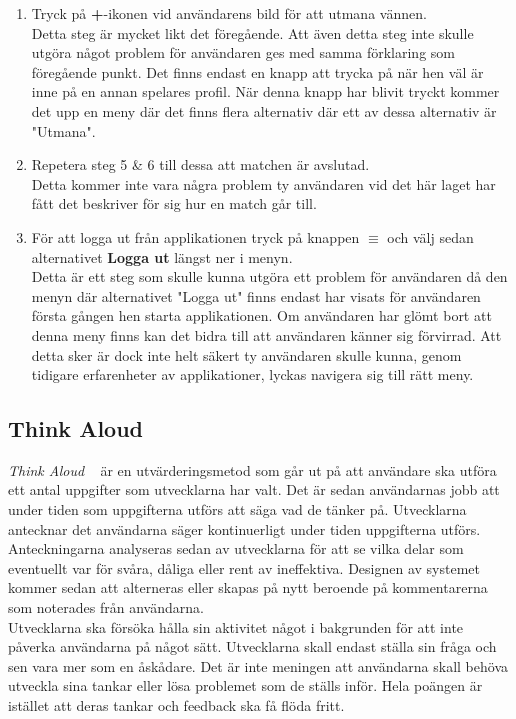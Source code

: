 \documentclass[a4paper, 11pt]{article}
\begin{document}
\begin{enumerate}
\item Tryck på \textbf{+}-ikonen vid användarens bild för att utmana vännen.\\
Detta steg är mycket likt det föregående. Att även detta steg inte skulle utgöra något problem för användaren ges med samma förklaring som föregående punkt. Det finns endast en knapp att trycka på när hen väl är inne på en annan spelares profil. När denna knapp har blivit tryckt kommer det upp en meny där det finns flera alternativ där ett av dessa alternativ är "Utmana".
\item Repetera steg 5 \& 6 till dessa att matchen är avslutad.\\
Detta kommer inte vara några problem ty användaren vid det här laget har fått det beskriver för sig hur en match går till.
\item För att logga ut från applikationen tryck på knappen \textbf{$\equiv$} och välj sedan alternativet \textbf{Logga ut} längst ner i menyn.\\
Detta är ett steg som skulle kunna utgöra ett problem för användaren då den menyn där alternativet "Logga ut" finns endast har visats för användaren första gången hen starta applikationen. Om användaren har glömt bort att denna meny finns kan det bidra till att användaren känner sig förvirrad. Att detta sker är dock inte helt säkert ty användaren skulle kunna, genom tidigare erfarenheter av applikationer, lyckas navigera sig till rätt meny.       
\end{enumerate}
 
\subsection{Think Aloud}
\textit{Think Aloud} ~\cite[sid 29--32]{thinkaloud} är en utvärderingsmetod som går ut på att användare ska utföra ett antal uppgifter som utvecklarna har valt. Det är sedan användarnas jobb att under tiden som uppgifterna utförs att säga vad de tänker på. Utvecklarna antecknar det användarna säger kontinuerligt under tiden uppgifterna utförs. Anteckningarna analyseras sedan av utvecklarna för att se vilka delar som eventuellt var för svåra, dåliga eller rent av ineffektiva. Designen av systemet kommer sedan att alterneras eller skapas på nytt beroende på kommentarerna som noterades från användarna.\\
Utvecklarna ska försöka hålla sin aktivitet något i bakgrunden för att inte påverka användarna på något sätt. Utvecklarna skall endast ställa sin fråga och sen vara mer som en åskådare. Det är inte meningen att användarna skall behöva utveckla sina tankar eller lösa problemet som de ställs inför. Hela poängen är istället att deras tankar och feedback ska få flöda fritt.\\
\end{document}
